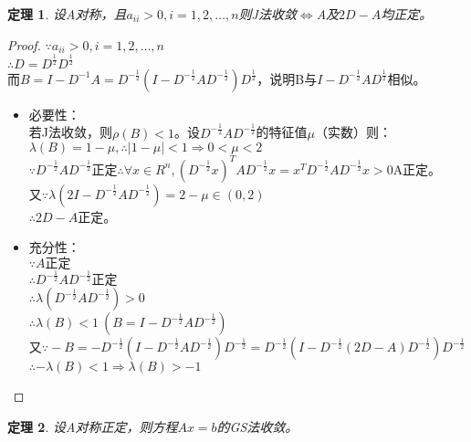 \documentclass[a4paper]{article}
\newtheorem{theorem}{定理}[section]
\begin{document}
\begin{theorem}
  设A对称，且$a_{ii}>0,i=1,2,\dots,n $则J法收敛$\Leftrightarrow$A及$2D-A$均正定。
\end{theorem}
\begin{proof}
  $\because a_{ii}>0, i=1,2,\dots, n $\\
  $\therefore D=D^{\frac{1}{2}}D^{\frac{1}{2}} $\\
  而$B=I-D^{-1}A=D^{-\frac{1}{2}}(I-D^{-\frac{1}{2}}AD^{-\frac{1}{2}} )D^\frac{1}{2} $，说明B与$I-D^{-\frac{1}{2}}AD^{\frac{1}{2}}$相似。

  \begin{itemize}
    \item 必要性：\\
      若J法收敛，则$\rho(B)<1$。设$D^{-\frac{1}{2}}AD^{-\frac{1}{2}} $的特征值$\mu$（实数）则：
      $\lambda(B) = 1-\mu, \therefore |1-\mu|<1\Rightarrow 0<\mu < 2$\\
      $\because D^{-\frac{1}{2}}AD^{-\frac{1}{2}}\text{正定} \therefore \forall x \in R^n, (D^{-\frac{1}{2}}x)^TAD^{-\frac{1}{2}}x = x^TD^{-\frac{1}{2}}AD^{-\frac{1}{2}}x >0$A正定。\\
      又$\because \lambda (2I-D^{-\frac{1}{2}}AD^{-\frac{1}{2}})=2-\mu \in (0,2)$\\
      $\therefore 2D-A$正定。
    \item 充分性：\\
      $\because A\text{正定}$\\
      $\therefore D^{-\frac{1}{2}}AD^{-\frac{1}{2}} \text{正定}$\\
      $\therefore \lambda(D^{-\frac{1}{2}}AD^{-\frac{1}{2}} )>0 $\\
      $\therefore \lambda(B)<1\ (B=I-D^{-\frac{1}{2}}AD^{-\frac{1}{2}})$\\
      又$\because -B=-D^{-\frac{1}{2}}(I-D^{-\frac{1}{2}}AD^{-\frac{1}{2}})D^{-\frac{1}{2}} 
          = D^{-\frac{1}{2}}(I-D^{-\frac{1}{2}}(2D-A)D^{-\frac{1}{2}})D^{-\frac{1}{2}}$
      $\therefore -\lambda(B)<1\Rightarrow \lambda(B) > -1$

  \end{itemize}

\end{proof}

\begin{theorem}
  设A对称正定，则方程$Ax=b$的GS法收敛。
\end{theorem}
\end{document}
